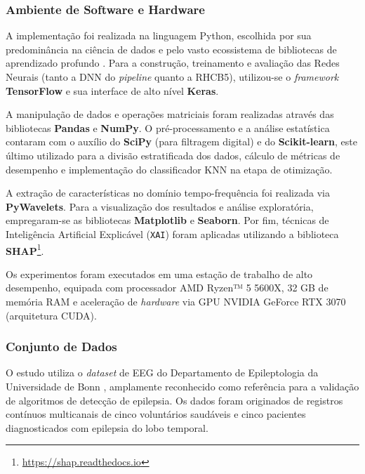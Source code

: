 \documentclass[alpha-refs,brazilian]{CC-EC_TF-TC}
\begin{document}
\subsubsection{Ambiente de Software e Hardware}

A implementação foi realizada na linguagem Python, escolhida por sua predominância na ciência de dados e pelo vasto ecossistema de bibliotecas de aprendizado profundo \citep{Roy2019Deep, Shoeibi2021}. Para a construção, treinamento e avaliação das Redes Neurais (tanto a DNN do \textit{pipeline} quanto a RHCB5), utilizou-se o \textit{framework} \textbf{TensorFlow} e sua interface de alto nível \textbf{Keras}.

A manipulação de dados e operações matriciais foram realizadas através das bibliotecas \textbf{Pandas} e \textbf{NumPy}. O pré-processamento e a análise estatística contaram com o auxílio do \textbf{SciPy} (para filtragem digital) e do \textbf{Scikit-learn}, este último utilizado para a divisão estratificada dos dados, cálculo de métricas de desempenho e implementação do classificador KNN na etapa de otimização.

A extração de características no domínio tempo-frequência foi realizada via \textbf{PyWavelets}. Para a visualização dos resultados e análise exploratória, empregaram-se as bibliotecas \textbf{Matplotlib} e \textbf{Seaborn}. Por fim, técnicas de Inteligência Artificial Explicável (\texttt{XAI}) foram aplicadas utilizando a biblioteca \textbf{SHAP}\footnote{\url{https://shap.readthedocs.io}}.

Os experimentos foram executados em uma estação de trabalho de alto desempenho, equipada com processador AMD Ryzen™ 5 5600X, 32 GB de memória RAM e aceleração de \textit{hardware} via GPU NVIDIA GeForce RTX 3070 (arquitetura CUDA).

\subsubsection{Conjunto de Dados}

O estudo utiliza o \textit{dataset} de EEG do Departamento de Epileptologia da Universidade de Bonn \citep{UKB_EEGDataDownload}, amplamente reconhecido como referência para a validação de algoritmos de detecção de epilepsia. Os dados foram originados de registros contínuos multicanais de cinco voluntários saudáveis e cinco pacientes diagnosticados com epilepsia do lobo temporal.
\end{document}
